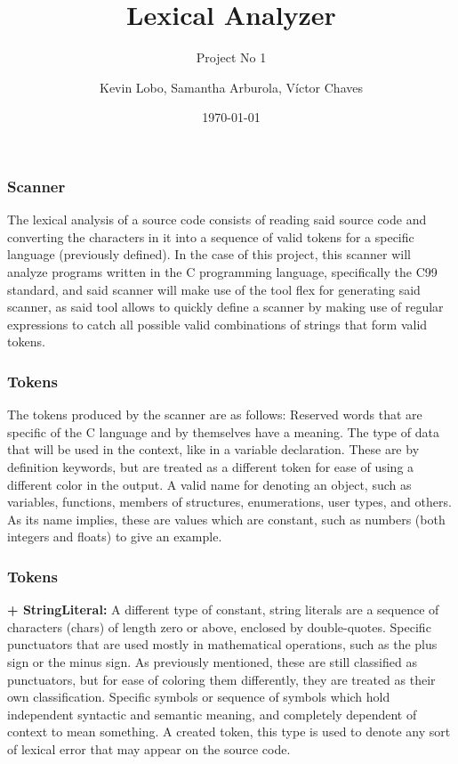\documentclass[tikz, xcolor=table]{beamer}
\title{Lexical Analyzer}
\subtitle{Project No 1}
\author{Kevin Lobo, Samantha Arburola, V\'ictor Chaves}
\institute{Semester I 2017 \linebreak Compilers and Interpreters \linebreak Computer Engineering}
\date{\today}
\begin{document}
\begin{frame}[plain,t] \titlepage \end{frame}
\begin{frame} \frametitle{Scanner} \small 
The lexical analysis of a source code consists of reading said source code and converting the characters in it into a sequence of valid tokens for a specific language (previously defined). In the case of this project, this scanner will analyze programs written in the C programming language, specifically the C99 standard, and said scanner will make use of the tool flex for generating said scanner, as said tool allows to quickly define a scanner by making use of regular expressions to catch all possible valid combinations of strings that form valid tokens.\end{frame}
\begin{frame} \frametitle{Tokens} \small 
The tokens produced by the scanner are as follows: \linebreak {} Reserved words that are specific of the C language and by themselves have a meaning. \linebreak {} The type of data that will be used in the context, like in a variable declaration. These are by definition keywords, but are treated as a different token for ease of using a different color in the output.\linebreak {} A valid name for denoting an object, such as variables, functions, members of structures, enumerations, user types, and others.\linebreak {} As its name implies, these are values which are constant, such as numbers (both integers and floats) to give an example.\end{frame}
\begin{frame} \frametitle{Tokens} \small 
{\bf + StringLiteral:} A different type of constant, string literals are a sequence of characters (chars) of length zero or above, enclosed by double-quotes. \linebreak {} Specific punctuators that are used mostly in mathematical operations, such as the plus sign or the minus sign. As previously mentioned, these are still classified as punctuators, but for ease of coloring them differently, they are treated as their own classification.\linebreak {} Specific symbols or sequence of symbols which hold independent syntactic and semantic meaning, and completely dependent of context to mean something.\linebreak {} A created token, this type is used to denote any sort of lexical error that may appear on the source code.\end{frame}
\end{document}
